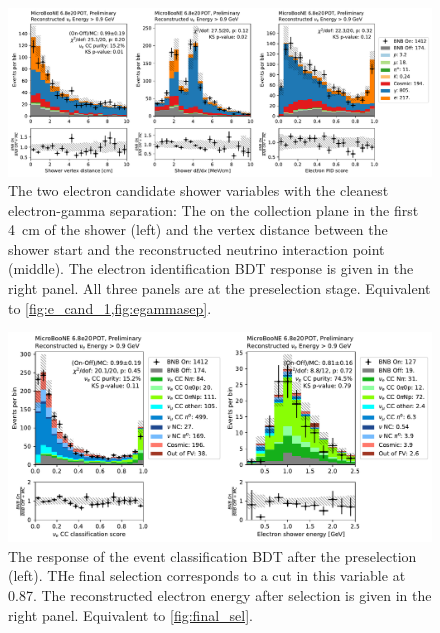 \begin{figure}[htb] 
    \centering
    \includegraphics[height=0.27\textheight]{Sidebands/Figures/nuecc/run123/fake_before.pdf}
\caption{\label{fig:nuecc:sideband:electron} The two electron candidate shower variables with the cleanest electron-gamma separation: The \dedx on the collection plane in the first \SI{4}{\cm} of the shower (left) and the vertex distance between the shower start and the reconstructed neutrino interaction point (middle). The electron identification BDT response is given in the right panel. All three panels are at the preselection stage. Equivalent to \cref{fig:e_cand_1,fig:egammasep}.}
\end{figure}

\begin{figure}[htb] 
    \centering
    \includegraphics[height=0.27\textheight]{Sidebands/Figures/nuecc/run123/event_bdt.pdf}
\caption{\label{fig:nuecc:sideband:bdt} The response of the \nuecc event classification BDT after the preselection (left). THe final selection corresponds to a cut in this variable at 0.87. The reconstructed electron energy after selection is given in the right panel. Equivalent to \cref{fig:final_sel}.}
\end{figure}

